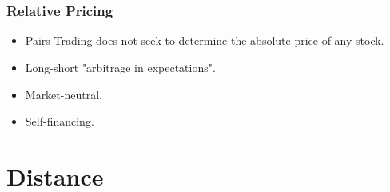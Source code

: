 \documentclass[pdf,10pt,xcolor=dvipsnames,hide notes]{beamer}
\begin{document}
\begin{frame}[label=frame1]
\begin{itemize}
\end{itemize}
\end{frame}
	

	\section{}
	
	\begin{frame}[label=frame1]
		\frametitle{Relative Pricing}
		
			
		\begin{itemize}
			\justifying
			

\setlength\itemsep{1em}
		
\item<1> Pairs Trading does not seek to determine the absolute price of any stock.

\vspace{0.3cm}
\item<1> Long-short "arbitrage in expectations".

\vspace{0.3cm}
\pause

\item<2> Market-neutral. 

\vspace{0.3cm}

\item<2> Self-financing.
\end{itemize}
	
	\end{frame}

	\section{Distance}
\end{document}
